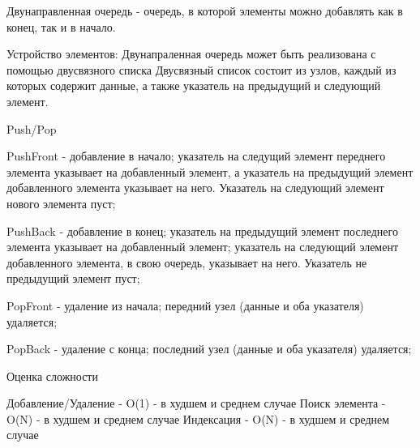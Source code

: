 Двунаправленная очередь - очередь, в которой элементы можно добавлять как в конец, так и в начало.

Устройство элементов:
Двунапраленная очередь может быть реализована с помощью двусвязного списка
Двусвязный список состоит из узлов, каждый из которых содержит данные, а также
указатель на предыдущий и следующий элемент.

Push/Pop

PushFront - добавление в начало;
указатель на следущий элемент переднего элемента указывает на добавленный элемент,
а указатель на предыдущий элемент добавленного элемента указывает на него.
Указатель на следующий элемент нового элемента пуст;

PushBack - добавление в конец;
указатель на предыдущий элемент последнего элемента указывает на добавленный элемент;
указатель на следующий элемент добавленного элемента, в свою очередь, указывает на него.
Указатель не предыдущий элемент пуст;

PopFront - удаление из начала;
передний узел (данные и оба указателя) удаляется;

PopBack - удаление с конца;
последний узел (данные и оба указателя) удаляется;

Оценка сложности

Добавление/Удаление - O(1) - в худшем и среднем случае
Поиск элемента - O(N) - в худшем и среднем случае
Индексация - O(N) - в худшем и среднем случае

